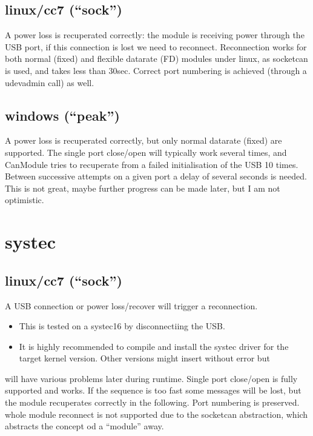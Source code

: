 \documentclass[a4paper,10pt,english]{sphinxmanual}
\begin{document}
\subsection{linux/cc7 (“sock”)}
\label{\detokenize{reconnection:linux-cc7-sock}}
\sphinxAtStartPar
A power loss is recuperated correctly: the module is receiving power through the USB port,
if this connection is lost we need to reconnect. Reconnection works for both normal (fixed)
and flexible datarate (FD) modules under linux, as socketcan is used, and takes less than 30sec.
Correct port numbering is achieved (through a udevadmin call) as well.


\subsection{windows (“peak”)}
\label{\detokenize{reconnection:windows-peak}}
\sphinxAtStartPar
A power loss is recuperated correctly, but only normal datarate (fixed) are supported.
The single port close/open will typically work several times, and CanModule tries to
recuperate from a failed initialisation of the USB 10 times. Between successive attempts on a
given port a delay of several seconds is needed. This is not great, maybe further progress
can be made later, but I am not optimistic.


\section{systec}
\label{\detokenize{reconnection:systec}}

\subsection{linux/cc7 (“sock”)}
\label{\detokenize{reconnection:id1}}
\sphinxAtStartPar
A USB connection or power loss/recover will trigger a reconnection.
\begin{itemize}
\item {} 
\sphinxAtStartPar
This is tested on a systec16 by disconnectiing the USB.

\item {} 
\sphinxAtStartPar
It is highly recommended to compile and install the systec driver for the target kernel version. Other versions might insert without error but

\end{itemize}

\sphinxAtStartPar
will have various problems later during runtime.
\sphinxhyphen{} Single port close/open is fully supported and works. If the sequence is too fast some messages will be lost, but the
module recuperates correctly in the following. Port numbering is preserved.
\sphinxhyphen{} whole module reconnect is not supported due to the socketcan abstraction, which abstracts the concept od a “module” away.
\end{document}
